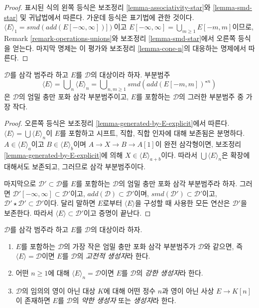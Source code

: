 \begin{proof}
표시된 식의 왼쪽 등식은 보조정리 \ref{lemma-associativity-star}와
\ref{lemma-smd-star} 및 귀납법에서 따른다. 가운데 등식은 표기법에
관한 것이다.
$\langle E \rangle_1 = smd(add(E[-\infty, \infty])])$이고
$E[-\infty, \infty] = \bigcup_{m \geq 1} E[-m, m]$이므로,
Remark \ref{remark-operations-unions}와 보조정리
\ref{lemma-smd-star}에서 오른쪽 등식을 얻는다. 마지막 명제는 이
평가와 보조정리 \ref{lemma-cone-n}의 대응하는 명제에서 따른다.
\end{proof}

\begin{lemma}
\label{lemma-find-smallest-containing-E}
$\mathcal{D}$를 삼각 범주라 하고 $E$를 $\mathcal{D}$의 대상이라 하자.
부분범주
$$
\langle E \rangle = \bigcup\nolimits_n \langle E \rangle_n
= \bigcup\nolimits_{n, m \geq 1} smd(add(E[-m, m])^{\star n})
$$
은 $\mathcal{D}$의 엄밀 충만 포화 삼각 부분범주이고, $E$를 포함하는
$\mathcal{D}$의 그러한 부분범주 중 가장 작다.
\end{lemma}

\begin{proof}
오른쪽 등식은 보조정리 \ref{lemma-generated-by-E-explicit}에서 따른다.
$\langle E \rangle = \bigcup \langle E \rangle_n$이 $E$를 포함하고
시프트, 직합, 직합 인자에 대해 보존됨은 분명하다.
$A \in \langle E \rangle_a$이고 $B \in \langle E \rangle_b$이며
$A \to X \to B \to A[1]$이 완전 삼각형이면, 보조정리
\ref{lemma-generated-by-E-explicit}에 의해
$X \in \langle E \rangle_{a + b}$이다. 따라서
$\bigcup \langle E \rangle_n$은 확장에 대해서도 보존되고, 그러므로
삼각 부분범주이다.

\medskip\noindent
마지막으로 $\mathcal{D}' \subset \mathcal{D}$를 $E$를 포함하는
$\mathcal{D}$의 엄밀 충만 포화 삼각 부분범주라 하자. 그러면
$\mathcal{D}'[-\infty, \infty] \subset \mathcal{D}'$이고,
$add(\mathcal{D}) \subset \mathcal{D}'$이며,
$smd(\mathcal{D}') \subset \mathcal{D}'$이고,
$\mathcal{D}' \star \mathcal{D}' \subset \mathcal{D}'$이다.
달리 말하면 $E$로부터 $\langle E \rangle$을 구성할 때 사용한 모든
연산은 $\mathcal{D}'$을 보존한다. 따라서
$\langle E \rangle \subset \mathcal{D}'$이고 증명이 끝난다.
\end{proof}

\begin{definition}
\label{definition-generators}
$\mathcal{D}$를 삼각 범주라 하고 $E$를 $\mathcal{D}$의 대상이라 하자.
\begin{enumerate}
\item $E$를 포함하는 $\mathcal{D}$의 가장 작은 엄밀 충만 포화 삼각
부분범주가 $\mathcal{D}$와 같으면, 즉
$\langle E \rangle = \mathcal{D}$이면 $E$를 $\mathcal{D}$의
{\it 고전적 생성자}라 한다.
\item 어떤 $n \geq 1$에 대해 $\langle E \rangle_n = \mathcal{D}$이면
$E$를 $\mathcal{D}$의 {\it 강한 생성자}라 한다.
\item $\mathcal{D}$의 임의의 영이 아닌 대상 $K$에 대해 어떤 정수
$n$과 영이 아닌 사상 $E \to K[n]$이 존재하면 $E$를 $\mathcal{D}$의
{\it 약한 생성자} 또는 {\it 생성자}라 한다.
\end{enumerate}
\end{definition}

